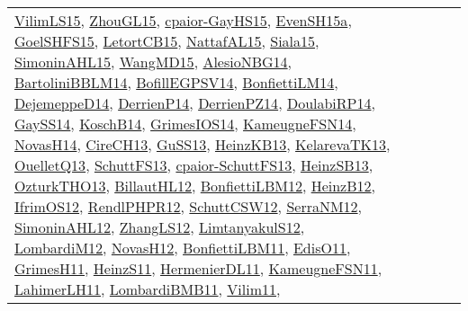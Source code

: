 {\begin{longtable}{lp{3cm}>{\raggedright}p{6cm}>{\raggedright}p{6cm}p{8cm}}
\href{papers/VilimLS15.pdf}{VilimLS15}\cite{VilimLS15}, \href{papers/ZhouGL15.pdf}{ZhouGL15}\cite{ZhouGL15}, \href{papers/cpaior-GayHS15.pdf}{cpaior-GayHS15}\cite{cpaior-GayHS15}, \href{articles/EvenSH15a.pdf}{EvenSH15a}\cite{EvenSH15a}, \href{articles/GoelSHFS15.pdf}{GoelSHFS15}\cite{GoelSHFS15}, \href{articles/LetortCB15.pdf}{LetortCB15}\cite{LetortCB15}, \href{articles/NattafAL15.pdf}{NattafAL15}\cite{NattafAL15}, \href{articles/Siala15.pdf}{Siala15}\cite{Siala15}, \href{articles/SimoninAHL15.pdf}{SimoninAHL15}\cite{SimoninAHL15}, \href{articles/WangMD15.pdf}{WangMD15}\cite{WangMD15}, \href{papers/AlesioNBG14.pdf}{AlesioNBG14}\cite{AlesioNBG14}, \href{papers/BartoliniBBLM14.pdf}{BartoliniBBLM14}\cite{BartoliniBBLM14}, \href{papers/BofillEGPSV14.pdf}{BofillEGPSV14}\cite{BofillEGPSV14}, \href{papers/BonfiettiLM14.pdf}{BonfiettiLM14}\cite{BonfiettiLM14}, \href{papers/DejemeppeD14.pdf}{DejemeppeD14}\cite{DejemeppeD14}, \href{papers/DerrienP14.pdf}{DerrienP14}\cite{DerrienP14}, \href{papers/DerrienPZ14.pdf}{DerrienPZ14}\cite{DerrienPZ14}, \href{papers/DoulabiRP14.pdf}{DoulabiRP14}\cite{DoulabiRP14}, \href{papers/GaySS14.pdf}{GaySS14}\cite{GaySS14}, \href{papers/KoschB14.pdf}{KoschB14}\cite{KoschB14}, \href{articles/GrimesIOS14.pdf}{GrimesIOS14}\cite{GrimesIOS14}, \href{articles/KameugneFSN14.pdf}{KameugneFSN14}\cite{KameugneFSN14}, \href{articles/NovasH14.pdf}{NovasH14}\cite{NovasH14}, \href{papers/CireCH13.pdf}{CireCH13}\cite{CireCH13}, \href{papers/GuSS13.pdf}{GuSS13}\cite{GuSS13}, \href{papers/HeinzKB13.pdf}{HeinzKB13}\cite{HeinzKB13}, \href{papers/KelarevaTK13.pdf}{KelarevaTK13}\cite{KelarevaTK13}, \href{papers/OuelletQ13.pdf}{OuelletQ13}\cite{OuelletQ13}, \href{papers/SchuttFS13.pdf}{SchuttFS13}\cite{SchuttFS13}, \href{papers/cpaior-SchuttFS13.pdf}{cpaior-SchuttFS13}\cite{cpaior-SchuttFS13}, \href{articles/HeinzSB13.pdf}{HeinzSB13}\cite{HeinzSB13}, \href{articles/OzturkTHO13.pdf}{OzturkTHO13}\cite{OzturkTHO13}, \href{papers/BillautHL12.pdf}{BillautHL12}\cite{BillautHL12}, \href{papers/BonfiettiLBM12.pdf}{BonfiettiLBM12}\cite{BonfiettiLBM12}, \href{papers/HeinzB12.pdf}{HeinzB12}\cite{HeinzB12}, \href{papers/IfrimOS12.pdf}{IfrimOS12}\cite{IfrimOS12}, \href{papers/RendlPHPR12.pdf}{RendlPHPR12}\cite{RendlPHPR12}, \href{papers/SchuttCSW12.pdf}{SchuttCSW12}\cite{SchuttCSW12}, \href{papers/SerraNM12.pdf}{SerraNM12}\cite{SerraNM12}, \href{papers/SimoninAHL12.pdf}{SimoninAHL12}\cite{SimoninAHL12}, \href{papers/ZhangLS12.pdf}{ZhangLS12}\cite{ZhangLS12}, \href{articles/LimtanyakulS12.pdf}{LimtanyakulS12}\cite{LimtanyakulS12}, \href{articles/LombardiM12.pdf}{LombardiM12}\cite{LombardiM12}, \href{articles/NovasH12.pdf}{NovasH12}\cite{NovasH12}, \href{papers/BonfiettiLBM11.pdf}{BonfiettiLBM11}\cite{BonfiettiLBM11}, \href{papers/EdisO11.pdf}{EdisO11}\cite{EdisO11}, \href{papers/GrimesH11.pdf}{GrimesH11}\cite{GrimesH11}, \href{papers/HeinzS11.pdf}{HeinzS11}\cite{HeinzS11}, \href{papers/HermenierDL11.pdf}{HermenierDL11}\cite{HermenierDL11}, \href{papers/KameugneFSN11.pdf}{KameugneFSN11}\cite{KameugneFSN11}, \href{papers/LahimerLH11.pdf}{LahimerLH11}\cite{LahimerLH11}, \href{papers/LombardiBMB11.pdf}{LombardiBMB11}\cite{LombardiBMB11}, \href{papers/Vilim11.pdf}{Vilim11}\cite{Vilim11}, 
\end{longtable}}
